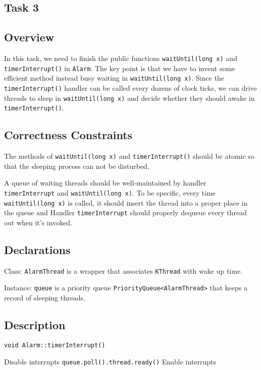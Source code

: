 \documentclass{article}
\begin{document}
\begin{spacing}{1.1}
\section{Task 3}
\subsection{Overview}
In this task, we need to finish the public functions \texttt{waitUntil(long x)} and \texttt{timerInterrupt()} in \texttt{Alarm}. The key point is that we have to invent some efficient method instead busy waiting in \texttt{waitUntil(long x)}. Since the \texttt{timerInterrupt()} handler can be called every dozens of clock ticks, we can drive threads to sleep in \texttt{waitUntil(long x)} and decide whether they should awake in \texttt{timerInterrupt()}.
\subsection{Correctness Constraints}
\begin{asparaitem}
  \item The methods of \texttt{waitUntil(long x)} and \texttt{timerInterrupt()} should be atomic so that the sleeping process can not be disturbed.
  \item A queue of waiting threads should be well-maintained by handler \texttt{timerInterrupt} and \texttt{waitUntil(long x)}. To be specific, every time \texttt{waitUntil(long x)} is called, it should insert the thread into a proper place in the queue and Handler \texttt{timerInterrupt} should properly dequeue every thread out when it's invoked.
\end{asparaitem}
\subsection{Declarations}
\begin{asparaitem}
\item Class: \texttt{AlarmThread} is a wrapper that associates \texttt{KThread} with wake up time.
\item Instance: \texttt{queue} is a priority queue \texttt{PriorityQueue<AlarmThread>} that keeps a record of sleeping threads.
\end{asparaitem}

\subsection{Description}
\begin{algorithm}
\caption{ \texttt{void Alarm::timerInterrupt()}}
\begin{algorithmic}
\STATE Disable interrupts
\STATE \texttt{queue.poll().thread.ready()}
\ENDWHILE
\STATE Enable interrupts
\end{algorithmic}
\end{algorithm}


\end{spacing}
\end{document}
